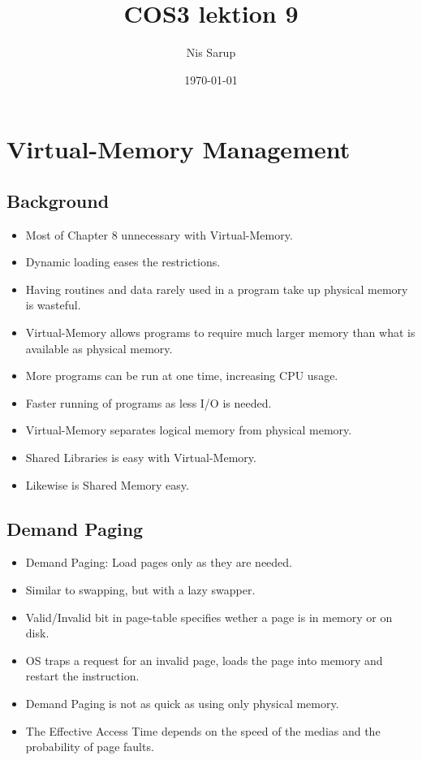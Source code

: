 \documentclass[a4wide,10pt]{article}
\begin{document}
\title{COS3 lektion 9}
\author{Nis Sarup}
\date{\today}
\maketitle


\addtocounter{section}{8}
\section{Virtual-Memory Management} %
\label{sec:virtual_memory_management}
\subsection{Background} %
\label{sub:background}
\begin{itemize}
	\item Most of Chapter 8 unnecessary with Virtual-Memory.
	\item Dynamic loading eases the restrictions.
	\item Having routines and data rarely used in a program take up physical memory is wasteful.
	\item Virtual-Memory allows programs to require much larger memory than what is available as physical memory.
	\item More programs can be run at one time, increasing CPU usage.
	\item Faster running of programs as less I/O is needed.
	\item Virtual-Memory separates logical memory from physical memory.
	\item Shared Libraries is easy with Virtual-Memory.
	\item Likewise is Shared Memory easy.
\end{itemize}

\subsection{Demand Paging} %
\label{sub:demand_paging}
\begin{itemize}
	\item Demand Paging: Load pages only as they are needed.
	\item Similar to swapping, but with a lazy swapper.
	\item Valid/Invalid bit in page-table specifies wether a page is in memory or on disk.
	\item OS traps a request for an invalid page, loads the page into memory and restart the instruction.
	\item Demand Paging is not as quick as using only physical memory.
	\item The Effective Access Time depends on the speed of the medias and the probability of page faults.
\end{itemize}
\end{document}
